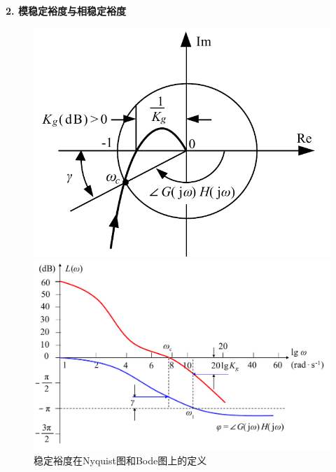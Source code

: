 \noindent \textbf{2. 模稳定裕度与相稳定裕度}
\begin{figure}[!htb]
	\begin{minipage}{0.4\linewidth}
		\centering
		\includegraphics[width=\linewidth]{pic/稳定裕度3.pdf}
	\end{minipage}
	\begin{minipage}{0.6\linewidth}
	\centering
	\includegraphics[width=\linewidth]{pic/稳定裕度4.pdf}
	\end{minipage}
	\caption{稳定裕度在Nyquist图和Bode图上的定义}
	\label{稳定裕度2}
\end{figure}
\vspace*{-1em}
